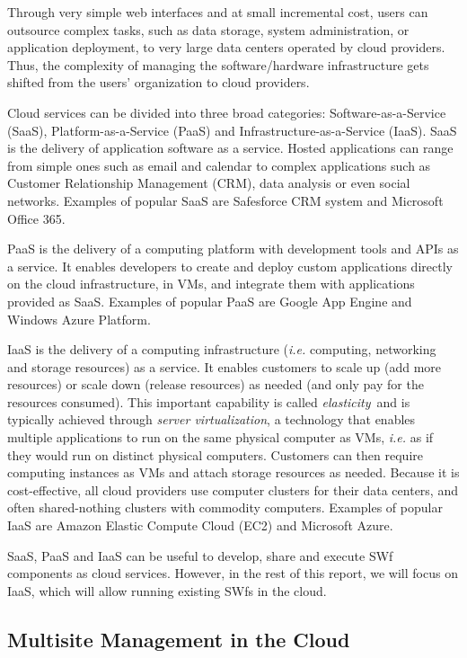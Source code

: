 Through very simple web interfaces and at small incremental cost,
users can outsource complex tasks, such as data storage, system
administration, or application deployment, to very large data centers
operated by cloud providers. Thus, the complexity of managing the
software/hardware infrastructure gets shifted from the users' organization to cloud providers.

Cloud services can be divided into
three broad categories: Software-as-a-Service (SaaS),
Platform-as-a-Service (PaaS)  and  Infrastructure-as-a-Service (IaaS).
SaaS is the delivery of application software as a service.
Hosted applications can range from simple ones such as email and
calendar to complex applications
such as Customer Relationship Management (CRM), data analysis or even social networks.
Examples of popular SaaS are Safesforce CRM system and Microsoft Office 365.

PaaS is the delivery of a computing platform with development tools
and APIs as a service. It enables developers to create and deploy
custom applications directly on the cloud infrastructure, in VMs, 
and integrate them with applications provided as
SaaS. Examples of popular PaaS are Google App Engine and
Windows Azure Platform.

IaaS is the delivery of a computing infrastructure (\textit{i.e.} computing, networking and storage resources) as a service. It enables customers to scale up (add more resources) or scale down (release resources) as needed (and only pay for the resources consumed).
This important capability is called \emph{elasticity}\ and is typically achieved through
\emph{server virtualization}, a technology that enables multiple
applications to run on the same physical computer as VMs,
\textit{i.e.} as if they would run on distinct physical computers. Customers
can then require computing instances as VMs and attach
storage resources as needed.
Because it is cost-effective, all cloud providers use computer
clusters for their data centers, and often shared-nothing clusters
with commodity computers.
Examples of popular IaaS are Amazon Elastic Compute Cloud (EC2) 
and Microsoft Azure.

SaaS, PaaS and IaaS can be useful to develop, share and
execute SWf components as cloud services. 
However, in the rest of this report, we will focus on IaaS, which
will allow running existing SWfs in the cloud.

\subsection{Multisite Management in the Cloud}
\label{sec:sub:MMC}

